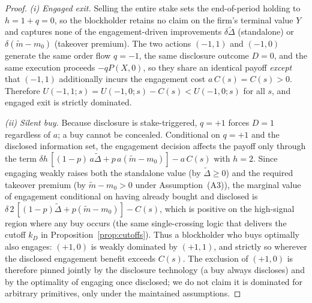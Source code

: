 \documentclass[11pt]{article}
\newcommand{\1}{\mathbf{1}}
\begin{document}
\begin{proof}
\emph{(i) Engaged exit.} Selling the entire stake sets the end-of-period holding to $h=1+q=0$, so the blockholder retains no claim on the firm's terminal value $Y$ and captures none of the engagement-driven improvements $\delta\tilde{\Delta}$ (standalone) or $\delta(\tilde{m}-m_0)$ (takeover premium). The two actions $(-1,1)$ and $(-1,0)$ generate the same order flow $q=-1$, the same disclosure outcome $D=0$, and the same execution proceeds $-qP(X,0)$, so they share an identical payoff \emph{except} that $(-1,1)$ additionally incurs the engagement cost $a\,C(s)=C(s)>0$. Therefore $U(-1,1;s)=U(-1,0;s)-C(s)<U(-1,0;s)$ for all $s$, and engaged exit is strictly dominated.

\emph{(ii) Silent buy.} Because disclosure is stake-triggered, $q=+1$ forces $D=1$ regardless of $a$; a buy cannot be concealed. Conditional on $q=+1$ and the disclosed information set, the engagement decision affects the payoff only through the term $\delta h\,[(1-p)\,a\tilde{\Delta}+p\,a(\tilde{m}-m_0)]-a\,C(s)$ with $h=2$. Since engaging weakly raises both the standalone value (by $\tilde\Delta\ge0$) and the required takeover premium (by $\tilde m-m_0>0$ under Assumption~\textup{(A3)}), the marginal value of engagement conditional on having already bought and disclosed is $\delta\,2\,[(1-p)\tilde\Delta+p(\tilde m-m_0)]-C(s)$, which is positive on the high-signal region where any buy occurs (the same single-crossing logic that delivers the cutoff $k_D$ in Proposition~\ref{prop:cutoffs}). Thus a blockholder who buys optimally also engages: $(+1,0)$ is weakly dominated by $(+1,1)$, and strictly so wherever the disclosed engagement benefit exceeds $C(s)$. The exclusion of $(+1,0)$ is therefore pinned jointly by the disclosure technology (a buy always discloses) and by the optimality of engaging once disclosed; we do not claim it is dominated for arbitrary primitives, only under the maintained assumptions.
\end{proof}
\end{document}
